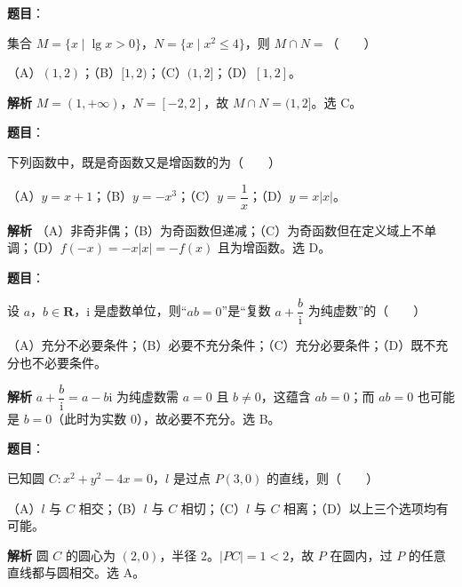 
\begin{answer}

\textbf{题目}：

集合 $M=\{x\mid\lg x>0\}$，$N=\{x\mid x^2\leqslant4\}$，则 $M\cap N=$\mbox{（　　）}

（A）$(1,2)$；（B）$[1,2)$；（C）$(1,2]$；（D）$[1,2]$。

\textbf{解析}
$M=(1,+\infty)$，$N=[-2,2]$，故 $M\cap N=(1,2]$。选 C。


\end{answer}
\begin{answer}

\textbf{题目}：

下列函数中，既是奇函数又是增函数的为\mbox{（　　）}

（A）$y=x+1$；（B）$y=-x^3$；（C）$y=\dfrac1x$；（D）$y=x|x|$。

\textbf{解析}
（A）非奇非偶；（B）为奇函数但递减；（C）为奇函数但在定义域上不单调；（D）$f(-x)=-x|x|=-f(x)$ 且为增函数。选 D。


\end{answer}
\begin{answer}

\textbf{题目}：

设 $a$，$b\in\mathbf R$，$\mathrm i$ 是虚数单位，则“$ab=0$”是“复数 $a+\dfrac b{\mathrm i}$ 为纯虚数”的\mbox{（　　）}

（A）充分不必要条件；（B）必要不充分条件；（C）充分必要条件；（D）既不充分也不必要条件。

\textbf{解析}
$a+\dfrac b{\mathrm i}=a-b\mathrm i$ 为纯虚数需 $a=0$ 且 $b\neq0$，这蕴含 $ab=0$；而 $ab=0$ 也可能是 $b=0$（此时为实数 $0$），故必要不充分。选 B。


\end{answer}
\begin{answer}

\textbf{题目}：

已知圆 $C:x^2+y^2-4x=0$，$l$ 是过点 $P(3,0)$ 的直线，则\mbox{（　　）}

（A）$l$ 与 $C$ 相交；（B）$l$ 与 $C$ 相切；（C）$l$ 与 $C$ 相离；（D）以上三个选项均有可能。

\textbf{解析}
圆 $C$ 的圆心为 $(2,0)$，半径 $2$。$|PC|=1<2$，故 $P$ 在圆内，过 $P$ 的任意直线都与圆相交。选 A。


\end{answer}
